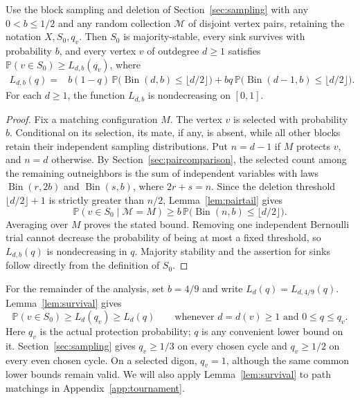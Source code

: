 \documentclass[10pt,a4paper]{article}
\DeclareMathOperator{\Bin}{Bin}
\newcommand{\Pp}{\mathbb P}
\newcommand{\floor}[1]{\lfloor #1\rfloor}
\begin{document}
\begin{lemma}\label{lem:survival}
Use the block sampling and deletion of Section~\ref{sec:sampling}
with any $0<b\le1/2$ and any random collection $\mathcal M$ of
disjoint vertex pairs, retaining the notation $X,S_0,q_v$.
Then $S_0$ is majority-stable, every sink survives with probability
$b$, and every vertex $v$ of outdegree $d\ge1$ satisfies
$\Pp(v\in S_0)\ge L_{d,b}(q_v)$, where
\begin{equation}\label{eq:Ldq}
\begin{aligned}
L_{d,b}(q)={}&b(1-q)\,\Pp\bigl(\Bin(d,b)\le\floor{d/2}\bigr)+bq\,\Pp\bigl(\Bin(d-1,b)\le\floor{d/2}\bigr).
\end{aligned}
\end{equation}
For each $d\ge1$, the function $L_{d,b}$ is nondecreasing on $[0,1]$.
\end{lemma}
\begin{proof}
Fix a matching configuration \(M\). The vertex \(v\) is selected with probability \(b\). Conditional on its selection, its mate, if any, is absent, while all other blocks retain their independent sampling distributions. Put \(n=d-1\) if \(M\) protects \(v\), and \(n=d\) otherwise. By Section~\ref{sec:paircomparison}, the selected count among the remaining outneighbors is the sum of independent variables with laws \(\Bin(r,2b)\) and \(\Bin(s,b)\), where \(2r+s=n\). Since the deletion threshold \(\floor{d/2}+1\) is strictly greater than \(n/2\), Lemma~\ref{lem:pairtail} gives
\[
\Pp(v\in S_0\mid\mathcal M=M)
\ge b\,\Pp\bigl(\Bin(n,b)\le\floor{d/2}\bigr).
\]
Averaging over \(M\) proves the stated bound. Removing one independent Bernoulli trial cannot decrease the probability of being at most a fixed threshold, so \(L_{d,b}(q)\) is nondecreasing in \(q\). Majority stability and the assertion for sinks follow directly from the definition of \(S_0\).
\end{proof}

For the remainder of the analysis, set \(b=4/9\) and write \(L_d(q)=L_{d,4/9}(q)\). Lemma~\ref{lem:survival} gives
\[
\Pp(v\in S_0)\ge L_d(q_v)\ge L_d(q)
\qquad\text{whenever }d=d(v)\ge1\text{ and }0\le q\le q_v.
\]
Here \(q_v\) is the actual protection probability; \(q\) is any convenient lower bound on it. Section~\ref{sec:sampling} gives \(q_v\ge1/3\) on every chosen cycle and \(q_v\ge1/2\) on every even chosen cycle. On a selected digon, \(q_v=1\), although the same common lower bounds remain valid. We will also apply Lemma~\ref{lem:survival} to path matchings in Appendix~\ref{app:tournament}.
\end{document}
